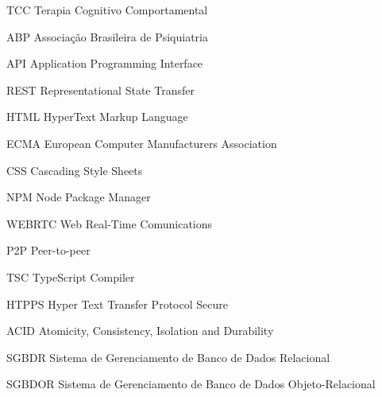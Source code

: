 \begin{siglas}
    \item[TCC] Terapia Cognitivo Comportamental
    \item[ABP] Associação Brasileira de Psiquiatria 
    \item[API] Application Programming Interface
    \item[REST] Representational State Transfer
    \item[HTML] HyperText Markup Language
    \item[ECMA] European Computer Manufacturers Association
    \item[CSS] Cascading Style Sheets 
    \item[NPM] Node Package Manager
    \item[WEBRTC] Web Real-Time Comunications
    \item[P2P] Peer-to-peer
    \item[TSC] TypeScript Compiler
    \item[HTPPS] Hyper Text Transfer Protocol Secure
    \item[ACID] Atomicity, Consistency, Isolation and Durability
    \item[SGBDR] Sistema de Gerenciamento de Banco de Dados Relacional   
    \item[SGBDOR] Sistema de Gerenciamento de Banco de Dados Objeto-Relacional   
\end{siglas}
